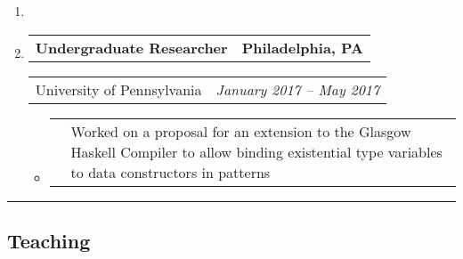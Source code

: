 \documentclass[letterpaper]{article}
\makeatletter
\newcommand*{\tabulardef}[3]{\begin{tabular}[t]{@{}lp{\dimexpr\linewidth-#1}@{}}
    #2&#3
\end{tabular}}
\newcommand{\headerrow}[2]
{\begin{tabular*}{\linewidth}{l@{\extracolsep{\fill}}r}
	#1 &
	#2 \\
\end{tabular*}}
\makeatother
\begin{document}
\begin{enumerate}[label=]
    \item 

	\item
		\headerrow
			{\textbf{Undergraduate Researcher}}
			{\textbf{Philadelphia, PA}}
	\headerrow
		{University of Pennsylvania}
		{\emph{January 2017 -- May 2017}}
  	\begin{itemize}[label= *]
	\parskip=-0.1em
\item\tabulardef{5cm}{}{Worked on a proposal for an extension to the Glasgow Haskell Compiler to allow binding existential type variables to data constructors in patterns}
	\end{itemize}
\end{enumerate}

\hrule
\vspace{-0.6em}
\subsection*{Teaching}
\end{document}

